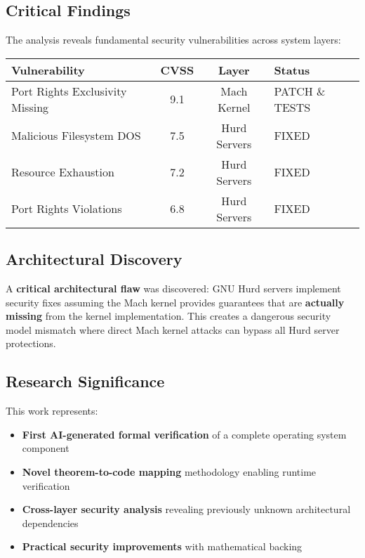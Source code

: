 \documentclass[11pt,a4paper]{article}
\begin{document}
\subsection{Critical Findings}

The analysis reveals fundamental security vulnerabilities across system layers:

\begin{center}
\begin{tabular}{|l|c|c|l|}
\hline
\textbf{Vulnerability} & \textbf{CVSS} & \textbf{Layer} & \textbf{Status} \\
\hline
\textcolor{criticalred}{Port Rights Exclusivity Missing} & \textcolor{criticalred}{9.1} & Mach Kernel & \textcolor{successgreen}{PATCH \& TESTS} \\
Malicious Filesystem DOS & 7.5 & Hurd Servers & \textcolor{successgreen}{FIXED} \\
Resource Exhaustion & 7.2 & Hurd Servers & \textcolor{successgreen}{FIXED} \\
Port Rights Violations & 6.8 & Hurd Servers & \textcolor{successgreen}{FIXED} \\
\hline
\end{tabular}
\end{center}

\subsection{Architectural Discovery}

A \textbf{critical architectural flaw} was discovered: GNU Hurd servers implement security fixes assuming the Mach kernel provides guarantees that are \textbf{actually missing} from the kernel implementation. This creates a dangerous security model mismatch where direct Mach kernel attacks can bypass all Hurd server protections.

\subsection{Research Significance}

This work represents:
\begin{itemize}
    \item \textbf{First AI-generated formal verification} of a complete operating system component
    \item \textbf{Novel theorem-to-code mapping} methodology enabling runtime verification
    \item \textbf{Cross-layer security analysis} revealing previously unknown architectural dependencies
    \item \textbf{Practical security improvements} with mathematical backing
\end{itemize}
\end{document}
